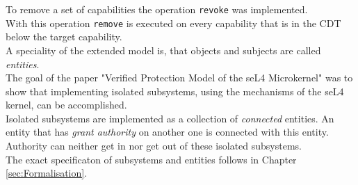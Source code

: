 To remove a set of capabilities the operation \texttt{revoke} was implemented. \\ 
With this operation \texttt{remove} is executed on every capability that is in the CDT below the target capability. \\
A speciality of the extended model is, that objects and subjects are called \textit{entities}.\\
The goal of the paper "Verified Protection Model of the seL4 Microkernel" was to show that implementing isolated subsystems, using the mechanisms of the seL4 kernel, can be accomplished. \cite{TakeG} \\
Isolated subsystems are implemented as a collection of \textit{connected} entities. An entity that has \textit{grant authority} on another one is connected with this entity. Authority can neither get in nor get out of these isolated subsystems.\\
The exact specificaton of subsystems and entities follows in Chapter \ref{sec:Formalisation}.